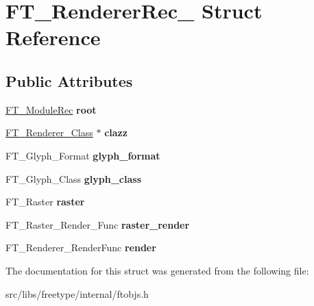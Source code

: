\hypertarget{struct_f_t___renderer_rec__}{
\section{FT\_\-RendererRec\_\- Struct Reference}
\label{struct_f_t___renderer_rec__}
}
\subsection*{Public Attributes}
\begin{DoxyCompactItemize}
\item 
\hypertarget{struct_f_t___renderer_rec___a7c93326898f03a9eb224f57104fa2433}{
\hyperlink{struct_f_t___module_rec__}{FT\_\-ModuleRec} {\bfseries root}}
\label{struct_f_t___renderer_rec___a7c93326898f03a9eb224f57104fa2433}

\item 
\hypertarget{struct_f_t___renderer_rec___a2b13c0a776ea7f589f41f576f9c4e8ad}{
\hyperlink{struct_f_t___renderer___class__}{FT\_\-Renderer\_\-Class} $\ast$ {\bfseries clazz}}
\label{struct_f_t___renderer_rec___a2b13c0a776ea7f589f41f576f9c4e8ad}

\item 
\hypertarget{struct_f_t___renderer_rec___a478b14f577b633cea7043fb17d404721}{
FT\_\-Glyph\_\-Format {\bfseries glyph\_\-format}}
\label{struct_f_t___renderer_rec___a478b14f577b633cea7043fb17d404721}

\item 
\hypertarget{struct_f_t___renderer_rec___a38a591be1d20fb2b4d81e48ebb624dd7}{
FT\_\-Glyph\_\-Class {\bfseries glyph\_\-class}}
\label{struct_f_t___renderer_rec___a38a591be1d20fb2b4d81e48ebb624dd7}

\item 
\hypertarget{struct_f_t___renderer_rec___a9c54a2da84f5892e0563d032ebd1ee09}{
FT\_\-Raster {\bfseries raster}}
\label{struct_f_t___renderer_rec___a9c54a2da84f5892e0563d032ebd1ee09}

\item 
\hypertarget{struct_f_t___renderer_rec___a6dc07268fc39d9dde130a5708607d19d}{
FT\_\-Raster\_\-Render\_\-Func {\bfseries raster\_\-render}}
\label{struct_f_t___renderer_rec___a6dc07268fc39d9dde130a5708607d19d}

\item 
\hypertarget{struct_f_t___renderer_rec___a197bfeb9dde4aef8eee87bc3ea95312e}{
FT\_\-Renderer\_\-RenderFunc {\bfseries render}}
\label{struct_f_t___renderer_rec___a197bfeb9dde4aef8eee87bc3ea95312e}

\end{DoxyCompactItemize}


The documentation for this struct was generated from the following file:\begin{DoxyCompactItemize}
\item 
src/libs/freetype/internal/ftobjs.h\end{DoxyCompactItemize}
